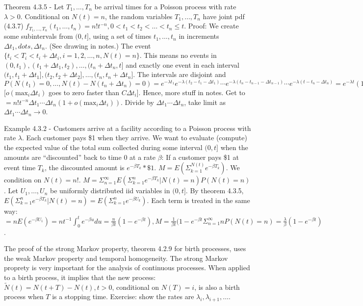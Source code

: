 \documentclass{article}
\begin{document}
Theorem 4.3.5 - Let $T_1, \dots, T_n$ be arrival times for a Poisson process with rate $\lambda > 0$. Conditional on $N(t) = n$, the random variables $T_1, \dots, T_n$ have joint pdf (4.3.7) $f_{T_1, \dots, T_n}(t_1, \dots, t_n) = n! t^{-n}, 0 < t_1 < t_2 < \dots < t_n \le t$. Proof: We create some subintervals from $(0, t]$, using a set of times $t_1, \dots, t_n$ in increments $\Delta t_1, dots, \Delta t_n$. (See drawing in notes.) The event $\{t_i < T_i < t_i + \Delta t_i, i = 1, 2, \dots, n, N(t) = n\}$. This means no events in $(0, t_1), (t_1 + \Delta t_1, t_2), \dots, (t_n + \Delta t_n, t]$ and exactly one event in each interval $(t_1, t_1 + \Delta t_1], (t_2, t_2 + \Delta t_2], \dots, (t_n, t_n + \Delta t_n]$. The intervals are disjoint and $P(N(t_1) = 0, \dots, N(t) - N(t_n + \Delta t_n)=0) = e^{-\lambda t_1} e^{-\lambda(t_2 - t_1 - \Delta t_1)} \cdots e^{-\lambda (t_n - t_{n-1} - \Delta t_{n-1})} \cdots e^{-\lambda(t - t_n - \Delta t_n)} = e^{-\lambda t} (1 + o(\mathrm{max}_i \Delta t_i)), P(N(t_1 + \Delta t_1) - N(t_1) = 1, \dots, N(t_n + \Delta t_n) - N(t_n) = 1) = \lambda (\Delta t_1) \lambda (\Delta t_2) \cdots \lambda(\Delta t_n) (1 + o(\mathrm{max}_i \Delta t_i))$ [$o(\mathrm{max}_i \Delta t_i)$ goes to zero faster than $C \Delta t_i$]. Hence, more stuff in notes. Get to $= n! t^{-n} \Delta t_1 \cdots \Delta t_n(1+ o(\mathrm{max}_i \Delta t_i))$. Divide by $\Delta t_1 \cdots \Delta t_n$, take limit as $\Delta t_1 \cdots \Delta t_n \rightarrow 0$.

Example 4.3.2 - Customers arrive at a facility according to a Poisson process with rate $\lambda$. Each customer pays \$1 when they arrive. We want to evaluate (compute) the expected value of the total sum collected during some interval $(0, t]$ when the amounts are ``discounted'' back to time 0 at a rate $\beta$: If a customer pays \$1 at event time $T_k$, the discounted amount is $e^{-\beta T_k} * \$1$. $M = E(\Sigma_{k=1}^{N(t)} e^{-\beta T_k})$. We condition on $N(t) = n!$. $M = \Sigma_{n=1}^\infty E(\Sigma_{k=1}^n e^{-\beta T_k} | N(t) = n) P(N(t) = n)$. Let $U_1, \dots, U_n$ be uniformly distributed iid variables in $(0, t]$. By theorem 4.3.5, $E(\Sigma_{k=1}^n e^{-\beta T_k} |N(t) = n) = E(\Sigma_{k=1}^n e^{-\beta U_k})$. Each term is treated in the same way: $= n E(e^{-\beta U_1}) = nt^{-1} \int_0^t e^{-\beta u} du = \frac{n}{\beta t}(1-e^{-\beta t}), M = \frac{1}{\beta t}(1-e^{-\beta t} \Sigma_{n=1}^\infty n P(N(t) = n) = \frac{\lambda}{\beta} (1-e^{-\beta t})$.

The proof of the strong Markov property, theorem 4.2.9 for birth processes, uses the weak Markov property and temporal homogeneity. The strong Markov proprety is very important for the analysis of continuous processes. When applied to a birth process, it implies that the new process: $\widetilde{N}(t) = N(t + T) - N(t), t > 0$, conditional on $N(T)=i$, is also a birth process when $T$ is a stopping time. Exercise: show the rates are $\lambda_i, \lambda_{i+1}, \dots$.
\end{document}
